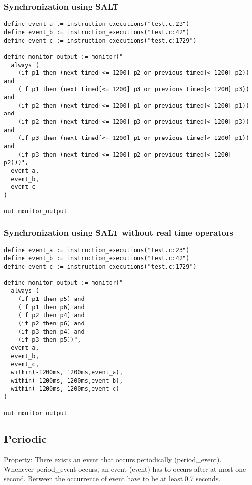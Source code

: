 \subsubsection{Synchronization using SALT}

\begin{lstlisting}
define event_a := instruction_executions("test.c:23")
define event_b := instruction_executions("test.c:42")
define event_c := instruction_executions("test.c:1729")

define monitor_output := monitor("
  always (
    (if p1 then (next timed[<= 1200] p2 or previous timed[< 1200] p2)) and
    (if p1 then (next timed[<= 1200] p3 or previous timed[< 1200] p3)) and
    (if p2 then (next timed[<= 1200] p1 or previous timed[< 1200] p1)) and
    (if p2 then (next timed[<= 1200] p3 or previous timed[< 1200] p3)) and
    (if p3 then (next timed[<= 1200] p1 or previous timed[< 1200] p1)) and
    (if p3 then (next timed[<= 1200] p2 or previous timed[< 1200] p2)))", 
  event_a, 
  event_b, 
  event_c
)

out monitor_output
\end{lstlisting}

\subsubsection{Synchronization using SALT without real time operators}

\begin{lstlisting}
define event_a := instruction_executions("test.c:23")
define event_b := instruction_executions("test.c:42")
define event_c := instruction_executions("test.c:1729")

define monitor_output := monitor("
  always (
    (if p1 then p5) and
    (if p1 then p6) and
    (if p2 then p4) and
    (if p2 then p6) and
    (if p3 then p4) and
    (if p3 then p5))",
  event_a,
  event_b,
  event_c,
  within(-1200ms, 1200ms,event_a),
  within(-1200ms, 1200ms,event_b),
  within(-1200ms, 1200ms,event_c)
)

out monitor_output
\end{lstlisting}

\subsection{Periodic}

Property: There exists an event that occurs periodically (period\_event). Whenever period\_event occurs, 
an event (event) has to occurs after at most one second. Between the occurrence of event have to be at least 0.7 seconds.

